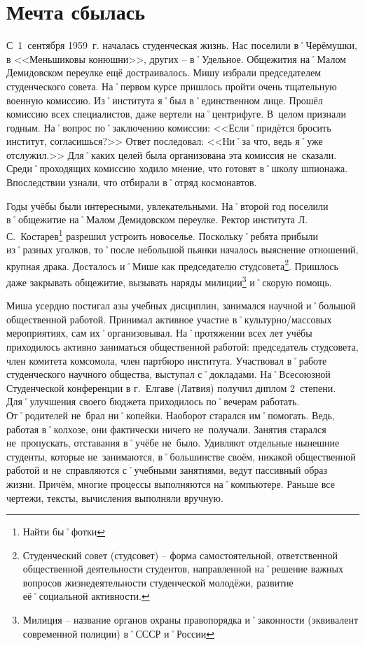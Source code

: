 ﻿\chapter{Мечта сбылась}

С~1~сентября 1959~г. началась студенческая жизнь. Нас поселили в˚Черёмушки, в <<Меньшиковы конюшни>>, других \--- в˚Удельное. Общежития на˚Малом Демидовском переулке ещё достраивалось. Мишу избрали председателем студенческого совета. На˚первом курсе пришлось пройти очень тщательную военную комиссию. Из˚института я˚был в˚единственном лице. Прошёл комиссию всех специалистов, даже вертели на˚центрифуге. В~целом признали годным. На˚вопрос по˚заключению комиссии: <<Если˚придётся бросить институт, согласишься?>> Ответ последовал: <<Ни˚за что, ведь я˚уже отслужил.>> Для˚каких целей была организована эта комиссия не~сказали. Среди˚проходящих комиссию ходило мнение, что готовят в˚школу шпионажа. Впоследствии узнали, что отбирали в˚отряд космонавтов.

Годы учёбы были интересными, увлекательными. На˚второй год поселили в˚общежитие на˚Малом Демидовском переулке. Ректор института Л.\,С.~Костарев\footnote{Найти бы˚фотки} разрешил устроить новоселье. Поскольку˚ребята прибыли из˚разных уголков, то˚после небольшой пьянки началось выяснение отношений, крупная драка. Досталось и˚Мише как председателю студсовета\footnote{Студенческий совет (студсовет) \--- форма самостоятельной, ответственной общественной деятельности студентов, направленной на˚решение важных вопросов жизнедеятельности студенческой молодёжи, развитие её˚социальной активности.}. Пришлось даже закрывать общежитие, вызывать наряды милиции\footnote{Милиция \--- название органов охраны правопорядка и˚законности (эквивалент современной полиции) в˚СССР и˚России} и˚скорую помощь.

Миша усердно постигал азы учебных дисциплин, занимался научной и˚большой общественной работой. Принимал активное участие в˚культурно\-/массовых мероприятиях, сам их˚организовывал. На˚протяжении всех лет учёбы приходилось активно заниматься общественной работой: председатель студсовета, член комитета комсомола, член партбюро института. Участвовал в˚работе студенческого научного общества, выступал с˚докладами. На˚Всесоюзной Студенческой конференции в г.~Елгаве (Латвия) получил диплом 2~степени. Для˚улучшения своего бюджета приходилось по˚вечерам работать. От˚родителей не~брал ни˚копейки. Наоборот старался им˚помогать. Ведь, работая в˚колхозе, они фактически ничего не~получали. Занятия старался не~пропускать, отставания в˚учёбе не~было. Удивляют отдельные нынешние студенты, которые не~занимаются, в˚большинстве своём, никакой общественной работой и не~справляются с˚учебными занятиями, ведут пассивный образ жизни. Причём, многие процессы выполняются на˚компьютере. Раньше все чертежи, тексты, вычисления выполняли вручную.

